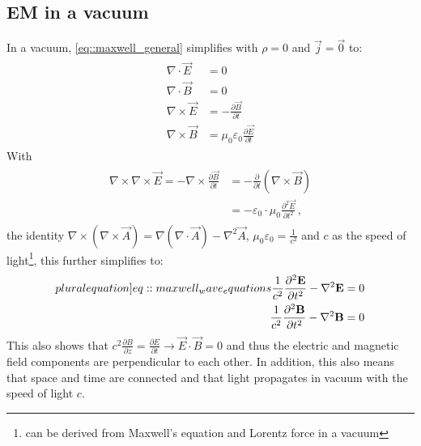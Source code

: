 \subsection{EM in a vacuum}
% 
In a vacuum, \cref{eq::maxwell_general} simplifies with $\rho = 0$ and $\vec{j} = \vec{0}$ to:
% 
\begin{align}
\begin{split} \label{eq::maxwell_vacuum}
  \nabla \cdot \vec{E} &= 0 \quad\\
  \nabla \cdot \vec{B} &= 0 \quad\\
  \nabla \times \vec{E} &= -\frac{\partial\vec B}{\partial t}\\
  \nabla \times \vec{B} &= \mu_0\varepsilon_0 \frac{\partial\vec E}{\partial t}
  \end{split}
\end{align}
% 
With 
\begin{align}
\begin{split} 
    \nabla \times \nabla \times \vec{E} = -\nabla \times \frac{\partial \vec{B}} {\partial t} &= -\frac{\partial} {\partial t} \left( \nabla \times  \vec{B} \right)\\
    &= -\varepsilon_0 \cdot \mu_0 \frac{\partial^2 \vec{E}}{\partial t^2} \, ,
\end{split}
\end{align}
% 
the identity $\nabla \times \left( \nabla \times \vec{A} \right) = \nabla(\nabla \cdot \vec{A}) - \nabla^{2}\vec{A}$, $\mu_0\varepsilon_0 = \frac{1}{c^2}$ and $c$ as the speed of light\footnote{can be derived from Maxwell's equation and Lorentz force in a vacuum}, this further simplifies to:
% 
\begin{align}
\begin{split} \label[pluralequation]{eq::maxwell_wave_equations}
  \frac{1}{c^2} \frac{\partial^2 \vec{E}}{\partial t^2} - \nabla^2 \vec{E} &= 0 \\
  \frac{1}{c^2} \frac{\partial^2 \vec{B}}{\partial t^2} - \nabla^2 \vec{B} &= 0
\end{split}
\end{align}
% 
This also shows that $c^2 \frac{\partial B} {\partial z} = \frac{\partial E}{\partial t} \rightarrow \vec{E} \cdot \vec{B} = 0$ and thus the electric and magnetic field components are perpendicular to each other.
In addition, this also means that space and time are connected and that light propagates in vacuum with the speed of light $c$.
% 
